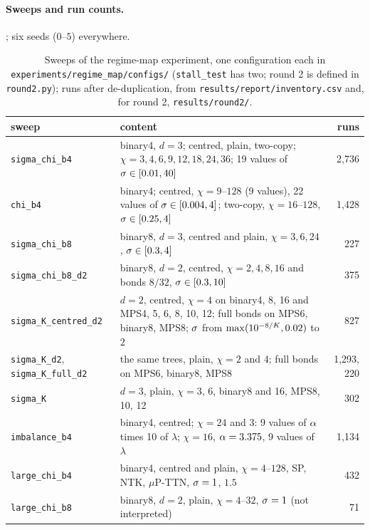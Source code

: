\paragraph{Sweeps and run counts.} ; six seeds ($0$--$5$) everywhere.

\begin{table}[ht]
  \centering
  \caption{Sweeps of the regime-map experiment, one configuration each in
    \texttt{experiments/regime\_map/configs/} (\texttt{stall\_test} has two; round 2 is defined in
    \texttt{round2.py}); runs after de-duplication, from \texttt{results/report/inventory.csv} and, for round 2,
    \texttt{results/round2/}.}
  \label{tab:exp-regimes}
  \footnotesize
  \begin{tabularx}{\textwidth}{@{}>{\raggedright\arraybackslash}p{3.0cm}X r@{}}
    \toprule
    sweep & content & runs \\
    \midrule
    \texttt{sigma\_chi\_b4} & binary4, $d=3$; centred, plain, two-copy; $\chi=3,4,6,9,12,18,24,36$; 19 values of
      $\sigma\in[0.01,40]$ & 2,736 \\
    \texttt{chi\_b4} & binary4; centred, $\chi=9$--$128$ (9 values), 22 values of $\sigma\in[0.004,4]$; two-copy,
      $\chi=16$--$128$, $\sigma\in[0.25,4]$ & 1,428 \\
    \texttt{sigma\_chi\_b8} & binary8, $d=3$, centred and plain, $\chi=3,6,24$, $\sigma\in[0.3,4]$ & 227 \\
    \texttt{sigma\_chi\_b8\_d2} & binary8, $d=2$, centred, $\chi=2,4,8,16$ and bonds $8/32$, $\sigma\in[0.3,10]$ & 375 \\
    \texttt{sigma\_K\_centred\_d2} & $d=2$, centred, $\chi=4$ on binary4, 8, 16 and MPS4, 5, 6, 8, 10, 12; full bonds
      on MPS6, binary8, MPS8; $\sigma$ from $\max(10^{-8/K},0.02)$ to $2$ & 827 \\
    \texttt{sigma\_K\_d2}, \texttt{sigma\_K\_full\_d2} & the same trees, plain, $\chi=2$ and $4$; full bonds on MPS6,
      binary8, MPS8 & 1,293, 220 \\
    \texttt{sigma\_K} & $d=3$, plain, $\chi=3$, $6$, binary8 and 16, MPS8, 10, 12 & 302 \\
    \texttt{imbalance\_b4} & binary4, centred; $\chi=24$ and $3$: 9 values of $\alpha$ times 10 of $\lambda$;
      $\chi=16$, $\alpha=3.375$, 9 values of $\lambda$ & 1,134 \\
    \texttt{large\_chi\_b4} & binary4, centred and plain, $\chi=4$--$128$, SP, NTK, $\mu$P-TTN, $\sigma=1$, $1.5$ & 432 \\
    \texttt{large\_chi\_b8} & binary8, $d=2$, plain, $\chi=4$--$32$, $\sigma=1$ (not interpreted) & 71 \\

\end{tabularx}
\end{table}
